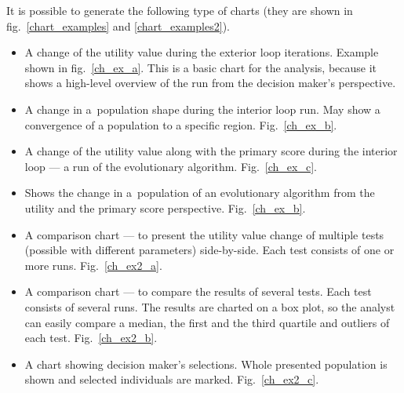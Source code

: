 It is possible to generate the following type of charts (they are shown in
fig.~\ref{chart_examples} and \ref{chart_examples2}).
\begin{itemize}
\item A change of the utility value during the exterior loop
  iterations. Example shown in fig.~\ref{ch_ex_a}. This is a basic chart for
  the analysis, because it shows a high-level overview of the run from the
  decision maker's perspective.
\item A change in a~population shape during the interior loop run. May show a
  convergence of a population to a specific region. Fig.~\ref{ch_ex_b}.
\item A change of the utility value along with the primary score during the
  interior loop --- a run of the evolutionary algorithm. Fig.~\ref{ch_ex_c}.
\item Shows the change in a~population of an evolutionary algorithm from the
  utility and the primary score perspective. Fig.~\ref{ch_ex_b}.
\item A comparison chart --- to present the utility value change of multiple
  tests (possible with different parameters) side-by-side. Each test
  consists of one or more runs. Fig.~\ref{ch_ex2_a}.
\item A comparison chart --- to compare the results of several tests. Each
  test consists of several runs. The results are charted on a box plot, so the
  analyst can easily compare a median, the first and the third quartile and
  outliers of each test. Fig.~\ref{ch_ex2_b}.
\item A chart showing decision maker's selections. Whole presented population
  is shown and selected individuals are marked. Fig.~\ref{ch_ex2_c}.
\end{itemize}

